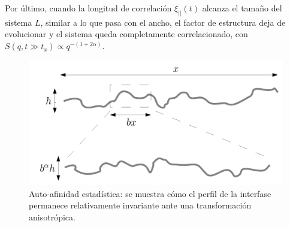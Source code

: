 Por último, cuando la longitud de correlación $\xi_{||}(t)$ alcanza el tamaño del sistema $L$, similar a lo que pasa con el ancho, el factor de estructura deja de evolucionar y el sistema queda completamente correlacionado, con $S(q,t \gg t_x)\propto q^{-(1+2\alpha)}$.

\begin{figure}[b]
    \centering
    \includegraphics[width=\imsize]{self_aff.png}
    \caption[Auto-afinidad estadística.]{Auto-afinidad estadística: se muestra cómo el perfil de la interfase permanece relativamente invariante ante una transformación anisotrópica.}
    \label{fig:self_aff}
\end{figure}

